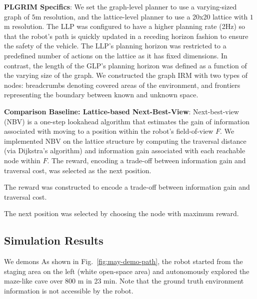 \documentclass{article}
\newcommand{\ph}[1]{{\textbf{#1}:}} %
\begin{document}
\ph{PLGRIM Specifics}
We set the graph-level planner to use a varying-sized graph of $5$m resolution, and the lattice-level planner to use a 20x20 lattice with $1$m resolution.  The LLP was configured to have a higher planning rate (2Hz) so that the robot's path is quickly updated in a receding horizon fashion to ensure the safety of the vehicle. The LLP's planning horizon was restricted to a predefined number of actions on the lattice as it has fixed dimensions.  In contrast, the length of the GLP's planning horizon was defined as a function of the varying size of the graph. We constructed the graph IRM with two types of nodes: breadcrumbs denoting covered areas of the environment, and frontiers representing the boundary between known and unknown space.  

\ph{Comparison Baseline: Lattice-based Next-Best-View}
Next-best-view (NBV) is a one-step lookahead algorithm that estimates the gain of information associated with moving to a position within the robot's field-of-view $F$. We implemented NBV on the lattice structure by computing the traversal distance (via Dijkstra's algorithm) and information gain associated with each reachable node within $F$. The reward, encoding a trade-off between information gain and traversal cost, was selected as the next position. 

The reward was constructed to encode a trade-off between information gain and traversal cost.

The next position was selected by choosing the node with maximum reward. 


\subsection{Simulation Results}

We demons
As shown in Fig.~\ref{fig:may-demo-path}, the robot started from the staging area on the left (white open-space area) and autonomously explored the maze-like cave over 800 m in 23 min.
Note that the ground truth environment information is not accessible by the robot.
\end{document}
